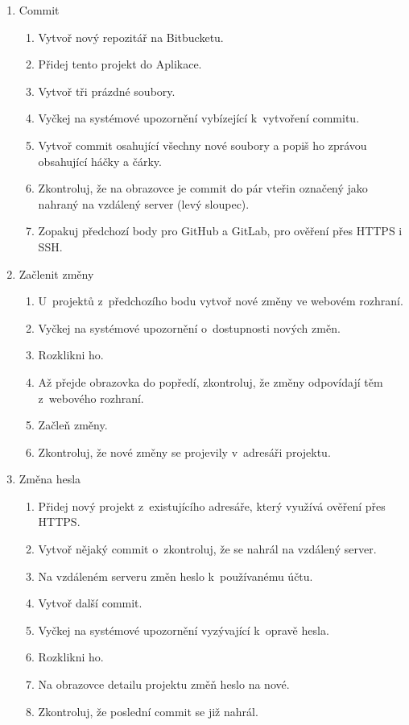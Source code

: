 \begin{enumerate}
	\item Commit
	\begin{enumerate}
		\item Vytvoř nový repozitář na Bitbucketu.
		\item Přidej tento projekt do Aplikace.
		\item Vytvoř tři prázdné soubory.
		\item Vyčkej na systémové upozornění vybízející k~vytvoření commitu.
		\item Vytvoř commit osahující všechny nové soubory a popiš ho zprávou obsahující háčky a čárky.
		\item Zkontroluj, že na obrazovce  je commit do pár vteřin označený jako nahraný na vzdálený server (levý sloupec).
		\item Zopakuj předchozí body pro GitHub a GitLab, pro ověření přes HTTPS i SSH.
	\end{enumerate}
	\item Začlenit změny
	\begin{enumerate}
		\item U~projektů z~předchozího bodu vytvoř nové změny ve webovém rozhraní.
		\item Vyčkej na systémové upozornění o~dostupnosti nových změn.
		\item Rozklikni ho.
		\item Až přejde obrazovka  do popředí, zkontroluj, že změny odpovídají těm z~webového rozhraní.
		\item Začleň změny.
		\item Zkontroluj, že nové změny se projevily v~adresáři projektu.
	\end{enumerate}
	\item Změna hesla
	\begin{enumerate}
		\item Přidej nový projekt z~existujícího adresáře, který využívá ověření přes HTTPS.
		\item Vytvoř nějaký commit o~zkontroluj, že se nahrál na vzdálený server.
		\item Na vzdáleném serveru změn heslo k~používanému účtu.
		\item Vytvoř další commit.
		\item Vyčkej na systémové upozornění vyzývající k~opravě hesla.
		\item Rozklikni ho.
		\item Na obrazovce detailu projektu změň heslo na nové.
		\item Zkontroluj, že poslední commit se již nahrál.

\end{enumerate}
\end{enumerate}
